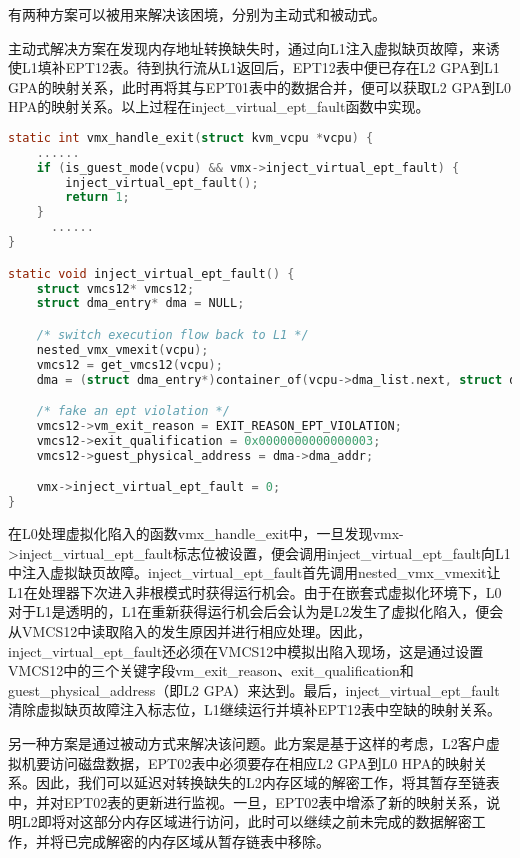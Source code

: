 有两种方案可以被用来解决该困境，分别为主动式和被动式。

主动式解决方案在发现内存地址转换缺失时，通过向L1注入虚拟缺页故障，来诱使L1填补EPT12表。待到执行流从L1返回后，EPT12表中便已存在L2 GPA到L1 GPA的映射关系，此时再将其与EPT01表中的数据合并，便可以获取L2 GPA到L0 HPA的映射关系。以上过程在inject\_virtual\_ept\_fault函数中实现。

\begin{lstlisting}[language={C}, caption={inject\_virtual\_ept\_fault函数实现源码}]
static int vmx_handle_exit(struct kvm_vcpu *vcpu) {
  	......
    if (is_guest_mode(vcpu) && vmx->inject_virtual_ept_fault) {
        inject_virtual_ept_fault();
        return 1;
    }
	  ......
}

static void inject_virtual_ept_fault() {	
    struct vmcs12* vmcs12;
    struct dma_entry* dma = NULL;

    /* switch execution flow back to L1 */
    nested_vmx_vmexit(vcpu);
    vmcs12 = get_vmcs12(vcpu);
    dma = (struct dma_entry*)container_of(vcpu->dma_list.next, struct dma_entry, next_entry);

    /* fake an ept violation */
    vmcs12->vm_exit_reason = EXIT_REASON_EPT_VIOLATION;
    vmcs12->exit_qualification = 0x0000000000000003;
    vmcs12->guest_physical_address = dma->dma_addr;

    vmx->inject_virtual_ept_fault = 0;
}
\end{lstlisting}

在L0处理虚拟化陷入的函数vmx\_handle\_exit中，一旦发现vmx->inject\_vi\-rtual\_ept\_fault标志位被设置，便会调用inject\_virtual\_ept\_fault向L1中注入虚拟缺页故障。inject\_virtual\_ept\_fault首先调用nested\_vmx\_vmexit让L1在处理器下次进入非根模式时获得运行机会。由于在嵌套式虚拟化环境下，L0对于L1是透明的，L1在重新获得运行机会后会认为是L2发生了虚拟化陷入，便会从VMCS12中读取陷入的发生原因并进行相应处理。因此，inject\_virtual\_ept\_fault还必须在VMCS12中模拟出陷入现场，这是通过设置VMCS12中的三个关键字段vm\_exit\_reason、exit\_qualification和guest\_physical\_address（即L2 GPA）来达到。最后，inject\_virtual\_ept\_fault清除虚拟缺页故障注入标志位，L1继续运行并填补EPT12表中空缺的映射关系。

另一种方案是通过被动方式来解决该问题。此方案是基于这样的考虑，L2客户虚拟机要访问磁盘数据，EPT02表中必须要存在相应L2 GPA到L0 HPA的映射关系。因此，我们可以延迟对转换缺失的L2内存区域的解密工作，将其暂存至链表中，并对EPT02表的更新进行监视。一旦，EPT02表中增添了新的映射关系，说明L2即将对这部分内存区域进行访问，此时可以继续之前未完成的数据解密工作，并将已完成解密的内存区域从暂存链表中移除。

